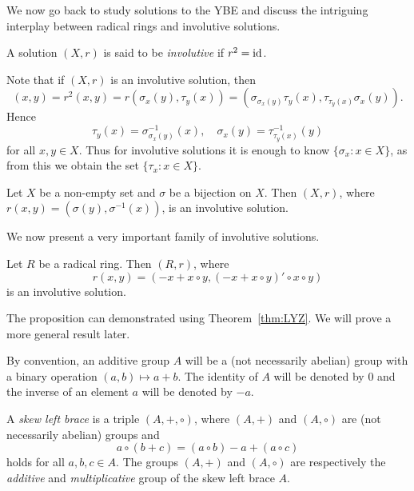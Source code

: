 We now go back to study solutions to the YBE and discuss the intriguing interplay
between radical rings and involutive solutions. 

\begin{definition}
	A solution $(X,r)$ is said to be \emph{involutive} if $r^2=\operatorname{id}$. 
\end{definition}

Note that if $(X,r)$ is an  involutive solution, then 
\[
(x,y)=r^2(x,y)=r(\sigma_x(y),\tau_y(x))=(\sigma_{\sigma_x(y)}\tau_y(x),\tau_{\tau_y(x)}\sigma_x(y)).
\]
Hence 
\begin{equation}
	\label{eq:involutive}
	\tau_y(x)=\sigma_{\sigma_x(y)}^{-1}(x),
	\quad
	\sigma_x(y)=\tau_{\tau_y(x)}^{-1}(y)
\end{equation}
for all $x,y\in X$. Thus for involutive solutions
it is enough to know $\{\sigma_x:x\in X\}$, as from this we obtain the
set $\{\tau_x:x\in X\}$.

\begin{example}
	Let $X$ be a non-empty set and $\sigma$ be a bijection on $X$. Then 
	$(X,r)$, where $r(x,y)=(\sigma(y),\sigma^{-1}(x))$, is an involutive solution. 
\end{example}

We now present a very important family of involutive solutions. 

\begin{theorem}[Rump]
	\label{thm:Rump}
	Let $R$ be a radical ring. Then $(R,r)$, where 
	\[
	r(x,y)=( -x+x\circ y,(-x+x\circ y)'\circ x\circ y)
	\]
	is an involutive solution.
\end{theorem}

The proposition can demonstrated using Theorem~\ref{thm:LYZ}. We will
prove a more general result later. 


By convention, an additive group $A$ will be a (not necessarily abelian) group 
with a binary operation $(a,b)\mapsto a+b$. The 
identity of $A$ will be denoted by $0$ 
and the inverse of an element $a$ will be denoted by $-a$. 

\begin{definition}
	A \emph{skew left brace} is a triple $(A,+,\circ)$, where $(A,+)$ and $(A,\circ)$ 
	are (not necessarily abelian) 
	groups and 
	\begin{equation}
	    \label{eq:compatibility}
	    a\circ(b+c)=(a\circ b)-a+(a\circ c)
	\end{equation}
	holds for all $a,b,c\in A$. The groups 
	$(A,+)$ and $(A,\circ)$ are respectively 
	the \emph{additive} and \emph{multiplicative} group
	of the skew left brace $A$.
\end{definition}


